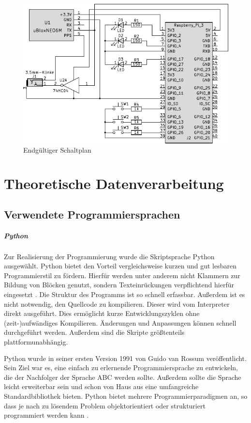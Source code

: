 \documentclass[a4paper,12pt,bibliography=totoc, listof=totoc,titlepage,pointlessnumbers]{scrreprt}
\begin{document}
\begin{figure}[!ht]
 \centering
 \includegraphics[width=1\textwidth]{img/schaltplanGesamt.pdf}
 \caption{Endgültiger Schaltplan}
 \label{abb:gesamtschaltung}
\end{figure}

\chapter{Theoretische Datenverarbeitung}
\label{c:datenverarbeitung}

\section{Verwendete Programmiersprachen}
\paragraph{Python}
Zur Realisierung der Programmierung wurde die Skriptsprache Python ausgewählt. Python bietet den Vorteil vergleichsweise kurzen und gut lesbaren Programmierstil zu fördern. Hierfür werden unter anderem nicht Klammern zur Bildung von Blöcken genutzt, sondern Texteinrückungen verpflichtend hierfür eingesetzt \citep[S. 13f]{python}. Die Struktur des Programms ist so schnell erfassbar. Außerdem ist es nicht notwendig, den Quellcode zu kompilieren. Dieser wird vom Interpreter direkt ausgeführt. Dies ermöglicht kurze Entwicklungszyklen ohne (zeit-)aufwändiges Kompilieren. Änderungen und Anpassungen können schnell durchgeführt werden. Außerdem sind die Skripte größtenteils plattformunabhängig.

Python wurde in seiner ersten Version 1991 von Guido van Rossum veröffentlicht. Sein Ziel war es, eine einfach zu erlernende Programmiersprache zu entwickeln, die der Nachfolger der Sprache ABC werden sollte. Außerdem sollte die Sprache leicht erweiterbar sein und schon von Haus aus eine umfangreiche Standardbibliothek bieten. Python bietet mehrere Programmierparadigmen an, so dass je nach zu lösendem Problem objektorientiert oder strukturiert programmiert werden kann \citep[S. 14]{python}.
\end{document}
